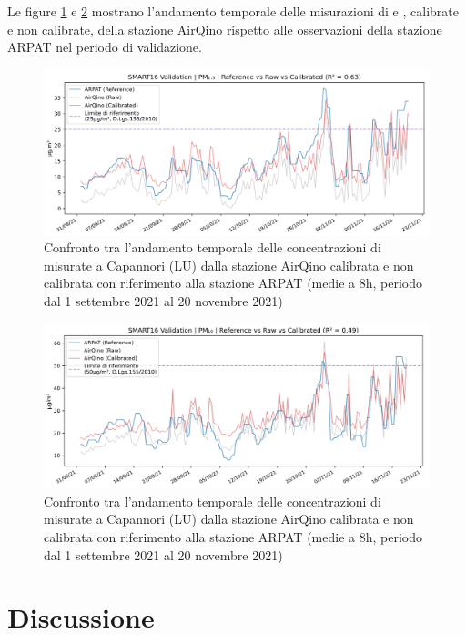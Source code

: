 Le figure \ref{fig:val-pm2.5} e \ref{fig:val-pm10} mostrano l'andamento temporale delle misurazioni di  e , calibrate e non calibrate, della stazione AirQino rispetto alle osservazioni della stazione ARPAT nel periodo di validazione.

\begin{figure}[H]
\centering
\includegraphics[width=\textwidth,height=\textheight,keepaspectratio]{img/val_pm2.5}
\caption{Confronto tra l'andamento temporale delle concentrazioni di  misurate a Capannori (LU) dalla stazione AirQino calibrata e non calibrata con riferimento alla stazione ARPAT (medie a 8h, periodo dal 1 settembre 2021 al 20 novembre 2021)}
\label{fig:val-pm2.5}
\end{figure}

\begin{figure}[H]
\centering
\includegraphics[width=\textwidth,height=\textheight,keepaspectratio]{img/val_pm10}
\caption{Confronto tra l'andamento temporale delle concentrazioni di  misurate a Capannori (LU) dalla stazione AirQino calibrata e non calibrata con riferimento alla stazione ARPAT (medie a 8h, periodo dal 1 settembre 2021 al 20 novembre 2021)}
\label{fig:val-pm10}
\end{figure}

\section{Discussione}\label{sec:discussione}

